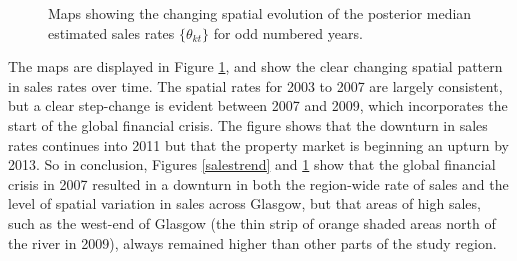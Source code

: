 \documentclass[article, nojss]{jss}
\begin{document}
\begin{figure}
\centering 
{}
\caption{Maps showing the changing spatial evolution of the posterior median estimated sales rates $\{\theta_{kt}\}$ for odd numbered years.\label{salesspatial}}
\end{figure} 

The maps are displayed in Figure \ref{salesspatial}, and show the clear changing spatial pattern in sales rates over time. The spatial rates for 2003 to 2007 are largely consistent, but a clear step-change is evident between 2007 and 2009, which incorporates the start of the global financial crisis. The figure shows that the downturn in sales rates continues into 2011 but that the property market is beginning an upturn by 2013. So in conclusion, Figures \ref{salestrend} and \ref{salesspatial} show that the global financial crisis in 2007 resulted in a downturn in both the region-wide rate of sales and the level of spatial variation in sales across Glasgow, but that areas of high sales, such as the west-end of Glasgow (the thin strip of orange shaded areas  north of the river in 2009), always remained higher than other parts of the study region. 
\end{document}
